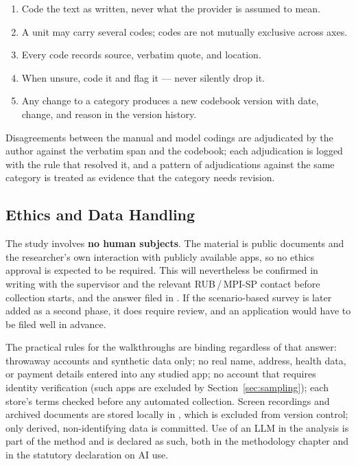 \begin{enumerate}[leftmargin=*,itemsep=1pt]
  \item Code the text as written, never what the provider is assumed to mean.
  \item A unit may carry several codes; codes are not mutually exclusive across
        axes.
  \item Every code records source, verbatim quote, and location.
  \item When unsure, code it and flag it --- never silently drop it.
  \item Any change to a category produces a new codebook version with date,
        change, and reason in the version history.
\end{enumerate}

Disagreements between the manual and model codings are adjudicated by the author
against the verbatim span and the codebook; each adjudication is logged with the
rule that resolved it, and a pattern of adjudications against the same category
is treated as evidence that the category needs revision.

\subsection{Ethics and Data Handling}
\label{sec:ethics}

The study involves \textbf{no human subjects}. The material is public documents
and the researcher's own interaction with publicly available apps, so no ethics
approval is expected to be required. This will nevertheless be confirmed in
writing with the supervisor and the relevant RUB\,/\,MPI-SP contact before
collection starts, and the answer filed in . If the
scenario-based survey is later added as a second phase, it does require review,
and an application would have to be filed well in advance.

The practical rules for the walkthroughs are binding regardless of that answer:
throwaway accounts and synthetic data only; no real name, address, health data,
or payment details entered into any studied app; no account that requires
identity verification (such apps are excluded by
Section~\ref{sec:sampling}); each store's terms checked before any automated
collection. Screen recordings and archived documents are stored locally in
, which is excluded from version control; only derived,
non-identifying data is committed. Use of an LLM in the analysis is part of the
method and is declared as such, both in the methodology chapter and in the
statutory declaration on AI use.

